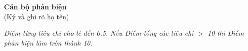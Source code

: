\vspace{3pt}
\hfill\begin{minipage}{6cm}\centering
  \textbf{Cán bộ phản biện}\\
  (Ký và ghi rõ họ tên)
\end{minipage}

\vspace{2pt}\par\noindent\scriptsize\textit{Điểm từng tiêu chí cho lẻ đến 0,5. Nếu Điểm
tổng các tiêu chí $>$ 10 thì Điểm phản biện làm tròn thành 10.}
\normalsize

\endgroup
\clearpage